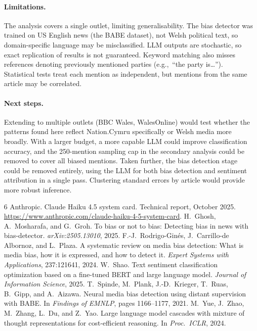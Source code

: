\documentclass[10pt]{article}
\begin{document}
\paragraph{Limitations.} The analysis covers a single outlet, limiting generalisability. The bias detector was trained on US English news (the BABE dataset), not Welsh political text, so domain-specific language may be misclassified. LLM outputs are stochastic, so exact replication of results is not guaranteed. Keyword matching also misses references denoting previously mentioned parties (e.g.,\ ``the party is\ldots''). Statistical tests treat each mention as independent, but mentions from the same article may be correlated.

\paragraph{Next steps.} Extending to multiple outlets (BBC Wales, WalesOnline) would test whether the patterns found here reflect Nation.Cymru specifically or Welsh media more broadly. With a larger budget, a more capable LLM could improve classification accuracy, and the 250-mention sampling cap in the secondary analysis could be removed to cover all biased mentions. Taken further, the bias detection stage could be removed entirely, using the LLM for both bias detection and sentiment attribution in a single pass. Clustering standard errors by article would provide more robust inference.


\begin{thebibliography}{6}
 Anthropic. Claude {Haiku} 4.5 system card. Technical report, October 2025. \url{https://www.anthropic.com/claude-haiku-4-5-system-card}.
 H.~Ghosh, A.~Mosharafa, and G.~Groh. To bias or not to bias: Detecting bias in news with bias-detector. \textit{arXiv:2505.13010}, 2025.
 F.-J.~Rodrigo-Gin\'{e}s, J.~Carrillo-de Albornoz, and L.~Plaza. A systematic review on media bias detection: What is media bias, how it is expressed, and how to detect it. \textit{Expert Systems with Applications}, 237:121641, 2024.
 W.~Shao. Text sentiment classification optimization based on a fine-tuned {BERT} and large language model. \textit{Journal of Information Science}, 2025.
 T.~Spinde, M.~Plank, J.-D.~Krieger, T.~Ruas, B.~Gipp, and A.~Aizawa. Neural media bias detection using distant supervision with {BABE}. In \textit{Findings of EMNLP}, pages 1166--1177, 2021.
 M.~Yue, J.~Zhao, M.~Zhang, L.~Du, and Z.~Yao. Large language model cascades with mixture of thought representations for cost-efficient reasoning. In \textit{Proc.\ ICLR}, 2024.
\end{thebibliography}
\end{document}
